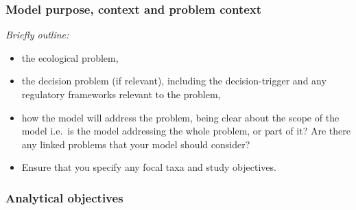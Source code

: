 \documentclass[
]{article}
\providecommand{\tightlist}{%
  \setlength{\itemsep}{0pt}\setlength{\parskip}{0pt}}
\begin{document}
\subsubsection{Model purpose, context and problem
context}\label{sec-model-purpose-context-and-problem-context}

\begin{tcolorbox}[enhanced jigsaw, opacitybacktitle=0.6, bottomrule=.15mm, leftrule=.75mm, rightrule=.15mm, colbacktitle=quarto-callout-caution-color!10!white, toprule=.15mm, titlerule=0mm, left=2mm, colframe=quarto-callout-caution-color-frame, breakable, title=\textcolor{quarto-callout-caution-color}{\faFire}\hspace{0.5em}{Preregistration Item}, opacityback=0, coltitle=black, bottomtitle=1mm, colback=white, toptitle=1mm, arc=.35mm]

\emph{Briefly outline:}

\begin{itemize}
\tightlist
\item[$\square$]
  the ecological problem,
\item[$\square$]
  the decision problem (if relevant), including the decision-trigger and
  any regulatory frameworks relevant to the problem,
\item[$\square$]
  how the model will address the problem, being clear about the scope of
  the model i.e.~is the model addressing the whole problem, or part of
  it? Are there any linked problems that your model should consider?
\item[$\square$]
  Ensure that you specify any focal taxa and study objectives.
\end{itemize}

\end{tcolorbox}

\subsubsection{Analytical objectives}\label{sec-analytical-objectives}
\end{document}
